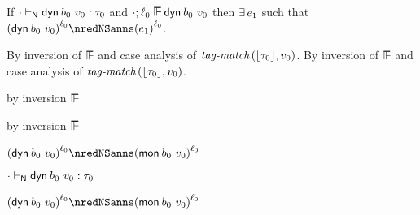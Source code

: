 \begin{lemma}\label{H-dyn-label-progress}
  If\/ ${\cdot} \vdash_{\mathsf{N}} \mathsf{dyn}^{}\,b_0~v_0 : \tau_0$
  and\/ $\snil; \sowner_0 \sWSOP \edynb{\sbnd_0}{\svalue_0}$
  then\/ $\exists\,e_1$
  such that\/ $\obars{\edynb{\sbnd_0}{\svalue_0}}{\sowner_0} \nredNSanns \obars{\sexpr_1}{\sowner_0}$.
\end{lemma}{
  \newcommand{\shortproof}{By inversion of $\sWSOP$ and case analysis of $\fshallow{\tagof{\stype_0}}{\svalue_0}$.}
\begin{lamportproof*}
  \shortproof
\mainproof
  \shortproof

    \begin{pfproof}
      by inversion $\sWSOP$
    \end{pfproof}

    \begin{pfproof}
      by inversion $\sWSOP$
    \end{pfproof}

    \begin{pfproof}
      \qedstep
        \begin{pfproof}
          $\obars{\edynb{\sbnd_0}{\svalue_0}}{\sowner_0} \nredNSanns \obars{\emon{\sbnd_0}{\svalue_0}}{\sowner_0}$
        \end{pfproof}
    \end{pfproof}

    \begin{pfproof}
      \absurdstep
        \begin{pfproof}
          ${\cdot} \vdash_{\mathsf{N}} \mathsf{dyn}^{}\,b_0~v_0 : \tau_0$
        \end{pfproof}
    \end{pfproof}

    \begin{pfproof}
      \qedstep
        \begin{pfproof}
          $\obars{\edynb{\sbnd_0}{\svalue_0}}{\sowner_0} \nredNSanns \obars{\emon{\sbnd_0}{\svalue_0}}{\sowner_0}$
        \end{pfproof}
    \end{pfproof}


\end{lamportproof*}}
